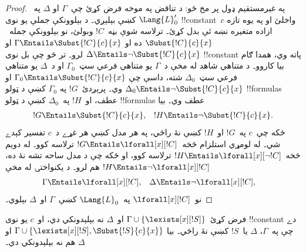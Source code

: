 \documentclass[../../../include/open-logic-section]{subfiles}
\begin{document}
\begin{proof}
په غيرمستقيم ډول پر مخ ځو: د تناقض په موخه فرض کړئ چې~$\Gamma$ او
$\Delta$ په~$\Lang{L}'_0$ کښې بېلېږي۔ د بېلوونکې جملې يو نوی !!{constant}~$c$ واخلئ او په يوه تازه ازاده متغيره نښه ئې بدل کړئ۔ ترلاسه شوې بڼه~$!C$ وبولئ، نو بېلوونکې جمله~$\Subst{!C}{c}{x}$ ده او $\Gamma \Entails \Subst{!C}{c}{x}$ او $\Delta \Entails \lnot \Subst{!C}{c}{x}$ لرو۔ تر څو چې بل نوی !!{constant} پاته وي، همدا ګام بيا کاروو۔ د متناهي شاهد له مخې د~$\Gamma$ يو
متناهي فرعي سټ~$\Gamma_0$ او د~$\Delta$ يو متناهي فرعي
سټ~$\Delta_0$ شته، داسې چې
$\Gamma_0 \Entails \Subst{!C}{c}{x}$ او
$\Delta_0 \Entails \lnot \Subst{!C}{c}{x}$ وي۔ پرېږدئ~$!G$ په
$\Gamma_0$ کښې د ټولو !!{formula}s عطف، او~$!H$ په~$\Delta_0$
کښې د ټولو !!{formula}s عطف وي۔ بيا
\begin{align*}
  !G & \Entails \Subst{!C}{c}{x}, & !H  \Entails \lnot \Subst{!C}{c}{x}.
\end{align*}
ځکه چې~$c$ په~$!G$ او~$!H$ کښې نۀ راځي، په هر مدل کښې هر غړے د~$c$ تفسير کېدے شي۔ له لومړي استلزام څخه~$!G \Entails \lforall[x][!C]$ ترلاسه کوو۔ له دويم څخه~$!H \Entails \lforall[x][\lnot !C]$ ترلاسه کوو، او ځکه چې د مدل ساحه تشه نۀ ده، $!H \Entails \lnot \lforall[x][!C]$ هم لرو۔ د يکنواختۍ له مخې
\begin{align*}
  \Gamma &\Entails \lforall[x][!C], &
  \Delta & \Entails \lnot \lforall[x][!C],
\end{align*}
نو~$\lforall[x][!C]$ په~$\Lang{L}_0$ کښې~$\Gamma$ او~$\Delta$
بېلوي۔
\end{proof}

\begin{lem}
فرض کړئ~$\Gamma \cup \{ \lexists[x][!S] \}$ او~$\Delta$ نه
بېلېدونکي دي، او~$c$ يو نوی !!{constant} دے چې په~$\Gamma$،
$\Delta$ يا~$!S$ کښې نۀ راځي۔ بيا
$\Gamma \cup \{ \lexists[x][!S], \Subst{!S}{c}{x} \}$ او
$\Delta$ هم نه بېلېدونکي دي۔
\end{lem}
\end{document}
